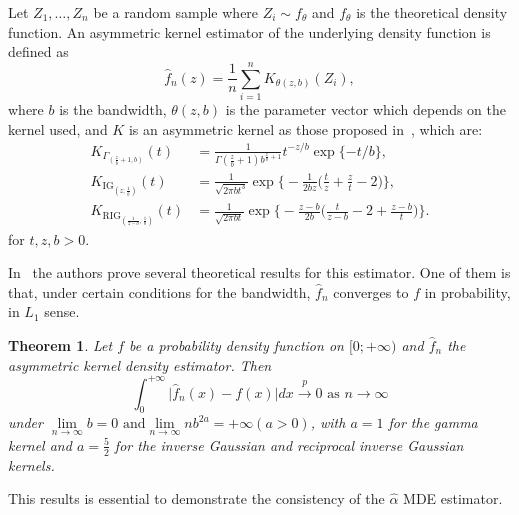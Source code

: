 \documentclass[technote,onecolumn,draftcls,12pt]{IEEEtran}
\numberwithin{equation}{section}
\newtheorem{theorem}{Theorem}[section]
\begin{document}
Let $Z_1, \ldots, Z_n$ be a random sample where $Z_i \sim f_{\theta}$ and $f_{\theta}$ is the theoretical density function. 
An asymmetric kernel estimator of the underlying density function is defined as 
\begin{equation}
\widehat{f}_n(z)=\frac{1}{n}\sum_{i=1}^n K_{\theta(z,b)}(Z_i),
\label{fn}
\end{equation}
where  $b$ is the bandwidth, ${\theta}(z,b)$ is the parameter vector which depends on the kernel used, and $K$ is an asymmetric kernel  as those proposed in~\cite{bouezmarni2005}, which are: 
\begin{align}
K_{\Gamma_{\left(\frac{z}{b}+1,b\right)}}(t) & =\frac{1}{\Gamma(\frac{z}{b}+1)b^{\frac{z}{b}+1}} t^{-{z}/{b}} \exp\{-{t}/{b}\},
\label{gammakernel}\\
K_{\text{IG}_{\left( z;\frac{1}{b}\right)}}(t) & =\frac{1}{\sqrt{2\pi b t^3}} 
\exp\Big\{-\frac{1}{2b z} \Big(\frac{t}{z}+\frac{z}{t}-2\Big)\Big\},
\label{IGkernel}\\
K_{\text{RIG}_{\left(\frac{1}{z-b},\frac{1}{b}\right)}}(t) & =\frac{1}{\sqrt{2\pi b t}} 
\exp\Big\{-\frac{z-b}{2b} \Big(\frac{t}{z-b}-2+\frac{z-b}{t}\Big)\Big\}.
\label{RIGkernel}
\end{align}
for $t,z,b>0$.

In~\cite{bouezmarni2005} the authors prove several theoretical results for this estimator. 
One of them is that, under certain conditions for the bandwidth, $\widehat{f}_n$ converges to $f$  in probability, in $L_1$ sense.


\begin{theorem}
	Let $f$ be a probability density function on $[0;+\infty)$ and $\widehat{f}_n$ the asymmetric kernel density estimator. Then
	\begin{equation}
	\int_0^{+\infty} \vert \widehat{f}_n(x)-f(x)\vert dx \stackrel{p} {\longrightarrow} 0 \text{ as } n \longrightarrow \infty
	\label{L1}
	\end{equation}
	under $\lim\limits_{n \to \infty} b = 0 \text{ and} \lim\limits_{n \to \infty} n b^{2a} = +\infty (a > 0)$, with $a = 1$ for the gamma kernel and $a = \frac{5}{2}$ for the
	inverse Gaussian and reciprocal inverse Gaussian kernels.
\end{theorem}

This results is essential to demonstrate the consistency of the $\widehat{\alpha}$ MDE estimator.
\end{document}
